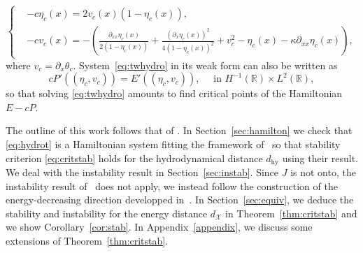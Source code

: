 \documentclass[11pt]{article}
\newcommand{\R}{\mathbb{R}}
\theoremstyle{plain}
\theoremstyle{definition}
\theoremstyle{remark}
\numberwithin{equation}{section}
\begin{document}
{	\begin{equation}\label{eq:twhydro}
		\left\{\begin{aligned}
			&-c\eta_c(x)=2v_c(x)(1-\eta_c(x)),\\
			&-cv_c(x)=-\left(\frac{\partial_{xx}\eta_c(x)}{2(1-\eta_c(x))}+\frac{(\partial_x\eta_c(x))^2}{4(1-\eta_c(x))^2}+v_c^2-\eta_c(x)-\kappa\partial_{xx}\eta_{c}(x)\right),
		\end{aligned}\right.
	\end{equation}
	where $v_c=\partial_x\theta_c$. System~\eqref{eq:twhydro} in its weak form can also be written as 
	\begin{equation}\label{eq:boundstatx}
		cP'((\eta_c,v_c))=E'((\eta_c,v_c)),\quad\text{ in } H^{{-1}}(\R)\times L^2(\R),
	\end{equation} 
	so that solving \eqref{eq:twhydro} amounts to find critical points of the Hamiltonian
	$E-cP.$
	
	The outline of this work follows that of \cite{linbubbles}.
	In Section~\ref{sec:hamilton} we check that \eqref{eq:hydrot} is a Hamiltonian system fitting the framework of~\cite{grillakisshatah} so that stability criterion \eqref{eq:critstab} holds for the hydrodynamical distance $d_{\mathrm{hy}}$ using their result. We deal with the instability result in Section~\ref{sec:instab}. Since $J$ is not onto, the instability result of~\cite{grillakisshatah} does not apply, we instead follow the construction of the energy-decreasing direction developped in~\cite{linbubbles}. In Section~\ref{sec:equiv}, we deduce the stability and instability for the energy distance $d_{\mathcal{X}}$ in Theorem~\ref{thm:critstab} and we show Corollary~\ref{cor:stab}. In Appendix~\ref{appendix}, we discuss some extensions of Theorem~\ref{thm:critstab}.
}
\end{document}
